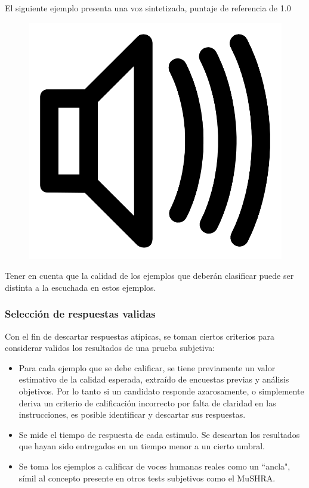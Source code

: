 El siguiente ejemplo presenta una voz sintetizada, puntaje de referencia de 1.0

\begin{figure}[H]
    \centering
    \includegraphics[scale=0.02]{imagenes/ale.jpg}
\end{figure}

Tener en cuenta que la calidad de los ejemplos que deberán clasificar puede ser distinta a la escuchada en estos ejemplos.


\subsubsection{Selección de respuestas validas}
Con el fin de descartar respuestas atípicas, se toman ciertos criterios para considerar validos los resultados de una prueba subjetiva:
\begin{itemize}
    \item Para cada ejemplo que se debe calificar, se tiene previamente un valor estimativo de la calidad esperada, extraído de encuestas previas y análisis objetivos. Por lo tanto si un candidato responde azarosamente, o simplemente deriva un criterio de calificación incorrecto por falta de claridad en las instrucciones,  es posible identificar y descartar sus respuestas.
    \item Se mide el tiempo de respuesta de cada estimulo. Se descartan los resultados que hayan sido entregados en un tiempo menor a un cierto umbral.
    \item Se toma los ejemplos a calificar de voces humanas reales como un “ancla", símil al concepto presente en otros tests subjetivos como el MuSHRA.
\end{itemize}

